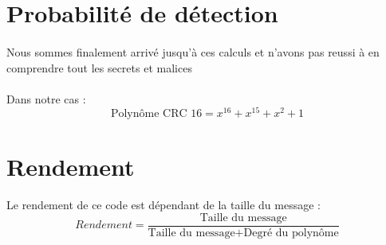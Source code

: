     \section{Probabilité de détection}

        \paragraph{}
Nous sommes finalement arrivé jusqu'à ces calculs et n'avons pas reussi à en comprendre tout les secrets et malices
        \paragraph{}
Dans notre cas :
\[  \text{Polynôme CRC 16} = x^{16} + x^{15} + x^{2}+ 1 \]


    \clearpage
    \section{Rendement}

        \paragraph{}
Le rendement de ce code est dépendant de la taille du message :
\[  Rendement = \frac{\text{Taille du message}}{\text{Taille du message} + \text{Degré du polynôme}} \]
